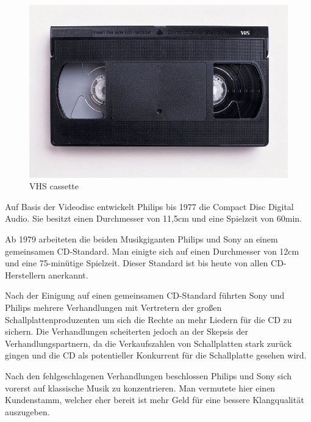 \begin{figure}[h]
\begin{center}
\begin{minipage}[t]{0.3\textwidth}
\begin{center}
            \includegraphics[height=0.1\textheight]{Bilder/Optische_Datentraeger_Die_Compact_Disc/Geschichte/vhs.png}
            \caption[VHS cassette \newline \url{https://upload.wikimedia.org/wikipedia/commons/6/67/VHS-cassette.jpg}]{VHS cassette}
            \label{fig:vhs}
        \end{center}
      \end{minipage}
  \end{center}
\end{figure}

Auf Basis der Videodisc entwickelt Philips bis 1977 die Compact Disc Digital
Audio. Sie besitzt einen Durchmesser von 11,5cm und eine Spielzeit von 60min.

Ab 1979 arbeiteten die beiden Musikgiganten Philips und Sony an einem
gemeinsamen CD-Standard. Man einigte sich auf einen Durchmesser von 12cm und
eine 75-minütige Spielzeit. Dieser Standard ist bis heute von allen
CD-Herstellern anerkannt. \cite{cds}

Nach der Einigung auf einen gemeinsamen CD-Standard führten Sony und Philips
mehrere Verhandlungen mit Vertretern der großen Schallplattenproduzenten um sich
die Rechte an mehr Liedern für die CD zu sichern. Die Verhandlungen scheiterten
jedoch an der Skepsis der Verhandlungspartnern, da die Verkaufszahlen von
Schallplatten stark zurück gingen und die CD als potentieller Konkurrent für die
Schallplatte gesehen wird.

Nach den fehlgeschlagenen Verhandlungen beschlossen Philips und Sony sich
vorerst auf klassische Musik zu konzentrieren. Man vermutete hier einen
Kundenstamm, welcher eher bereit ist mehr Geld für eine bessere Klangqualität
auszugeben.


